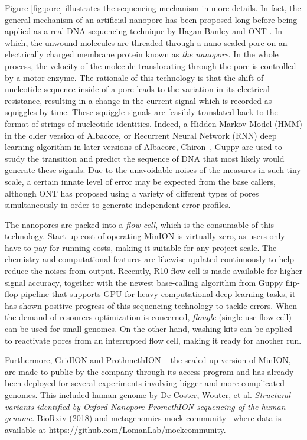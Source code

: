 Figure \ref{fig:pore} illustrates the sequencing mechanism in more details.
In fact, the general mechanism of an artificial nanopore has been proposed \cite{Kasianowicz1996,Church1998} long before being applied as a real DNA sequencing technique by Hagan Banley and ONT \cite{Clarke2009}. 
In which, the unwound molecules are threaded through a nano-scaled pore on an electrically charged membrane protein known as \emph{the nanopore}. 
In the whole process, the velocity of the molecule translocating through the pore is controlled by a motor enzyme.
The rationale of this technology is that the shift of nucleotide sequence inside of a pore leads to the variation in its electrical resistance, resulting in a change in the current signal which is recorded as squiggles by time. These squiggle signals are feasibly translated back to the format of strings of nucleotide identities.
Indeed, a Hidden Markov Model (HMM) \cite{Baum1966,Baum1970} in the older version of Albacore, or Recurrent Neural Network (RNN) deep learning algorithm in later versions of Albacore, Chiron~\cite{teng2018chiron}, Guppy are used to study the transition and predict the sequence of DNA that most likely would generate these signals. 
Due to the  unavoidable noises of the measures in such tiny scale, a certain innate level of error may be expected from the base callers, although ONT has proposed using a variety of different types of pores simultaneously in order to generate independent error profiles. 

The nanopores are packed into a \emph{flow cell}, which is the consumable of this technology. Start-up cost of operating MinION is virtually zero, as users only have to pay for running costs, making it suitable for any project scale.  
The chemistry and computational features are likewise updated continuously to help reduce the noises from output. Recently, R10 flow cell is made available for higher signal accuracy, together with the newest base-calling algorithm from Guppy flip-flop pipeline that supports GPU for heavy computational deep-learning tasks, it has shown positive progress of this sequencing technology to tackle errors. When the demand of resources optimization is concerned, \emph{flongle} (single-use flow cell) can be used for small genomes. On the other hand, washing kits can be applied to reactivate pores from an interrupted flow cell, making it ready for another run.  

Furthermore, GridION and ProthmethION -- the scaled-up version of MinION, are made to public by the company through its access program and has already been deployed for several experiments involving bigger and more complicated genomes. This included human genome by De Coster, Wouter, et al. \emph{Structural variants identified by Oxford Nanopore PromethION sequencing of the human genome.} BioRxiv (2018) and metagenomics mock community~\cite{Nicholls2019zymo} where data is available at \url{https://github.com/LomanLab/mockcommunity}. 

